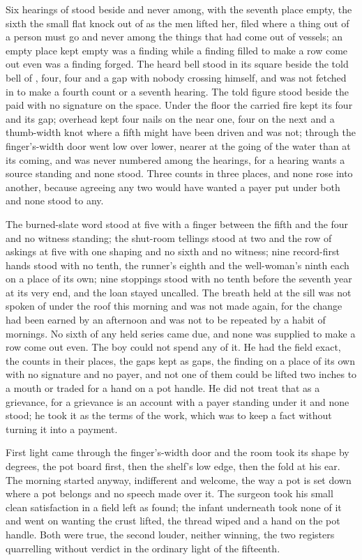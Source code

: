 Six hearings of  stood beside and never among, with the seventh place empty, the sixth the small flat knock out of  as the men lifted her, filed where a thing out of a person must go and never among the things that had come out of vessels; an empty place kept empty was a finding while a finding filled to make a row come out even was a finding forged. The heard bell stood in its square beside the told bell of , four, four and a gap with nobody crossing himself, and was not fetched in to make a fourth count or a seventh hearing. The told figure stood beside the paid with no signature on the space. Under the floor the carried fire kept its four and its gap; overhead  kept four nails on the near one, four on the next and a thumb-width knot where a fifth might have been driven and was not; through the finger's-width door  went low over lower, nearer at the going of the water than at its coming, and was never numbered among the hearings, for a hearing wants a source standing and none stood. Three counts in three places, and none rose into another, because agreeing any two would have wanted a payer put under both and none stood to any.

The burned-slate word stood at five with a finger between the fifth and the four and no witness standing; the shut-room tellings stood at two and the row of askings at five with one shaping and no sixth and no witness; nine record-first hands stood with no tenth, the runner's eighth and the well-woman's ninth each on a place of its own; nine stoppings stood with no tenth before the seventh year at its very end, and the loan stayed uncalled. The breath held at the sill was not spoken of under the roof this morning and was not made again, for the change had been earned by an afternoon and was not to be repeated by a habit of mornings. No sixth of any held series came due, and none was supplied to make a row come out even. The boy could not spend any of it. He had the field exact, the counts in their places, the gaps kept as gaps, the finding on a place of its own with no signature and no payer, and not one of them could be lifted two inches to a mouth or traded for a hand on a pot handle. He did not treat that as a grievance, for a grievance is an account with a payer standing under it and none stood; he took it as the terms of the work, which was to keep a fact without turning it into a payment.

\scenebreak

First light came through the finger's-width door and the room took its shape by degrees, the pot board first, then the shelf's low edge, then the fold at his ear. The morning started anyway, indifferent and welcome, the way a pot is set down where a pot belongs and no speech made over it. The surgeon took his small clean satisfaction in a field left as found; the infant underneath took none of it and went on wanting the crust lifted, the thread wiped and a hand on the pot handle. Both were true, the second louder, neither winning, the two registers quarrelling without verdict in the ordinary light of the fifteenth.

